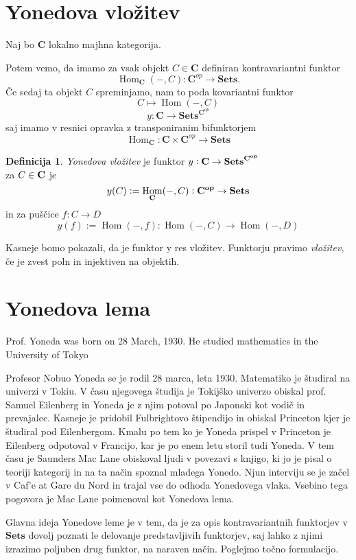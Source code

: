 \documentclass[12pt,a4paper]{book}
\theoremstyle{definition}
\newtheorem{definicija}{Definicija}[chapter]
\theoremstyle{plain}
\theoremstyle{definition}
\theoremstyle{remark}
\newcommand{\cat}[1]{\textbf{#1}}
\DeclareMathOperator{\Hom}{Hom}
\begin{document}
\section{Yonedova vložitev}

Naj bo $\mathbf{C}$ lokalno majhna kategorija.



Potem vemo, da imamo za vsak objekt $C \in \cat{C}$ definiran kontravariantni funktor 
$$\Hom_{\cat{C}}(-,C) : \cat{C}^{op} \to \cat{Sets}.$$
Če sedaj ta objekt $C$ spreminjamo, nam to poda kovariantni funktor
$$C \mapsto \Hom(-,C)$$
$$y : \mathbf{C} \to \mathbf{Sets}^{\cat{C}^{op}}$$
saj imamo v resnici opravka z transponiranim bifunktorjem
$$\Hom_{\cat{C}} : \cat{C} \times \cat{C}^{op} \to \cat{Sets}$$


\begin{definicija} {\it Yonedova vložitev} je funktor $y : \bf{C} \to \bf{Sets}^{\bf{C}^{op}}$ \\  za $C \in \bf{C}$ je $$y(C) := \Hom_{\bf{C}}(-, C) : \bf{C}^{op} \to \bf{Sets}$$ in za puščice $f : C \to D$
$$y(f) := \Hom(-,f) : \Hom(-,C) \to \Hom(-,D)$$
\end{definicija}

Kasneje bomo pokazali, da je funktor y res vložitev. Funktorju pravimo {\it vložitev}, če je zvest poln in injektiven na objektih.

\section{Yonedova lema}

Prof. Yoneda was born on 28 March, 1930.  He studied mathematics in
the University of Tokyo

Profesor Nobuo Yoneda se je rodil 28 marca, leta 1930. Matematiko je študiral na univerzi v Tokiu. V času njegovega študija je Tokijško univerzo obiskal prof. Samuel Eilenberg in Yoneda je z njim potoval po Japonski kot vodič in prevajalec. Kasneje je pridobil Fulbrightovo štipendijo in obiskal Princeton kjer je študiral pod Eilenbergom. Kmalu po tem ko je Yoneda prispel v Princeton je Eilenberg odpotoval v Francijo, kar je po enem letu storil tudi Yoneda. V tem času je Saunders Mac Lane obiskoval ljudi v povezavi s knjigo, ki jo je pisal o teoriji kategorij in na ta način spoznal mladega Yonedo. Njun interviju se je začel v Caf'e at Gare du Nord in trajal vse do odhoda Yonedovega vlaka. Vsebino tega pogovora je Mac Lane poimenoval kot Yonedova lema.


Glavna ideja Yonedove leme je v tem, da je za opis kontravariantnih funktorjev v $\cat{Sets}$ dovolj poznati le delovanje predstavljivih funktorjev, saj lahko z njimi izrazimo poljuben drug funktor, na naraven način. Poglejmo točno formulacijo.
\end{document}
